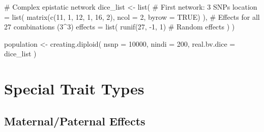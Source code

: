 \documentclass[
  letterpaper,
]{book}
\newenvironment{Shaded}{\begin{snugshade}}{\end{snugshade}}
\newcommand{\AttributeTok}[1]{\textcolor[rgb]{0.40,0.45,0.13}{#1}}
\newcommand{\CommentTok}[1]{\textcolor[rgb]{0.37,0.37,0.37}{#1}}
\newcommand{\ConstantTok}[1]{\textcolor[rgb]{0.56,0.35,0.01}{#1}}
\newcommand{\DecValTok}[1]{\textcolor[rgb]{0.68,0.00,0.00}{#1}}
\newcommand{\FunctionTok}[1]{\textcolor[rgb]{0.28,0.35,0.67}{#1}}
\newcommand{\NormalTok}[1]{\textcolor[rgb]{0.00,0.23,0.31}{#1}}
\newcommand{\OtherTok}[1]{\textcolor[rgb]{0.00,0.23,0.31}{#1}}
\newcommand{\SpecialCharTok}[1]{\textcolor[rgb]{0.37,0.37,0.37}{#1}}
\begin{document}
\begin{Shaded}
\begin{Highlighting}[]
\CommentTok{\# Complex epistatic network}
\NormalTok{dice\_list }\OtherTok{\textless{}{-}} \FunctionTok{list}\NormalTok{(}
  \CommentTok{\# First network: 3 SNPs}
  \AttributeTok{location =} \FunctionTok{list}\NormalTok{(}
    \FunctionTok{matrix}\NormalTok{(}\FunctionTok{c}\NormalTok{(}\DecValTok{11}\NormalTok{, }\DecValTok{1}\NormalTok{,}
             \DecValTok{12}\NormalTok{, }\DecValTok{1}\NormalTok{,}
             \DecValTok{16}\NormalTok{, }\DecValTok{2}\NormalTok{), }\AttributeTok{ncol =} \DecValTok{2}\NormalTok{, }\AttributeTok{byrow =} \ConstantTok{TRUE}\NormalTok{)}
\NormalTok{  ),}
  \CommentTok{\# Effects for all 27 combinations (3\^{}3)}
  \AttributeTok{effects =} \FunctionTok{list}\NormalTok{(}
    \FunctionTok{runif}\NormalTok{(}\DecValTok{27}\NormalTok{, }\SpecialCharTok{{-}}\DecValTok{1}\NormalTok{, }\DecValTok{1}\NormalTok{)  }\CommentTok{\# Random effects}
\NormalTok{  )}
\NormalTok{)}

\NormalTok{population }\OtherTok{\textless{}{-}} \FunctionTok{creating.diploid}\NormalTok{(}
  \AttributeTok{nsnp =} \DecValTok{10000}\NormalTok{,}
  \AttributeTok{nindi =} \DecValTok{200}\NormalTok{,}
  \AttributeTok{real.bv.dice =}\NormalTok{ dice\_list}
\NormalTok{)}
\end{Highlighting}
\end{Shaded}

\section{Special Trait Types}\label{sec-special-traits}

\subsection{Maternal/Paternal Effects}\label{maternalpaternal-effects}
\end{document}
